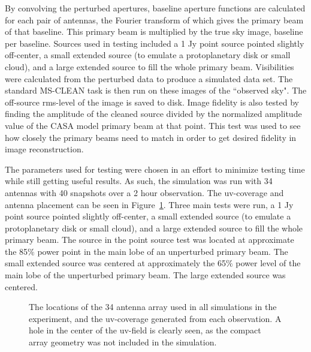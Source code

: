 \documentclass[11pt]{article}
\begin{document}
By convolving the perturbed apertures, baseline aperture functions are 
calculated for each pair of antennas, the Fourier transform of which gives the 
primary beam of that baseline. This primary beam is multiplied by the true sky 
image, baseline per baseline.  Sources used in testing included a 1 Jy point 
source pointed slightly off-center, a small extended source (to emulate a 
protoplanetary disk or small cloud), and a large extended source to fill the 
whole primary beam.  Visibilities were calculated from the perturbed data to 
produce a simulated data set. The standard MS-CLEAN task is then run on these 
images of the ``observed sky".  The off-source rms-level of the image is saved 
to disk. Image fidelity is also tested by finding the amplitude of the cleaned 
source divided by the normalized amplitude value of the CASA model primary beam 
at that point.  This test was used to see how closely the primary beams need to 
match in order to get desired fidelity in image reconstruction.

The parameters used for testing were chosen in an effort to minimize testing
time while still getting useful results. As such, the simulation was run
with 34 antennas with 40 snapshots over a 2 hour observation. The uv-coverage
and antenna placement can be seen in Figure~\ref{fig:params}. Three main tests
were run, a 1 Jy point source pointed slightly off-center, a small extended 
source (to emulate a protoplanetary disk or small cloud), and a large extended 
source to fill the whole primary beam. The source in the point source test was
located at approximate the 85$\%$ power point in the main lobe of an 
unperturbed primary beam. The small extended source was centered at 
approximately the 65$\%$ power level of the main lobe of the unperturbed 
primary beam. The large extended source was centered.

\begin{figure}
    \centering
    \quad
    \caption{
        The locations of the 34 antenna array used in all simulations in the
        experiment, and the uv-coverage generated from each observation. A
        hole in the center of the uv-field is clearly seen, as the compact 
        array geometry was not included in the simulation.
    }
    \label{fig:params}
\end{figure}
\end{document}
